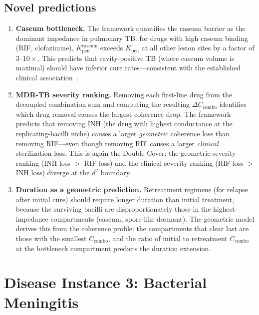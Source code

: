 \documentclass[11pt]{article}
\theoremstyle{plain}
\theoremstyle{definition}
\newcommand{\Ccombo}{C_{\mathrm{combo}}}
\begin{document}
\subsection{Novel predictions}
\label{sec:tb-predictions}

\begin{enumerate}
  \item \textbf{Caseum bottleneck.}
    The framework quantifies the caseum barrier as the dominant
    impedance in pulmonary TB: for drugs with high caseum binding
    (RIF, clofazimine), $K_{\mathrm{pen}}^{\mathrm{caseum}}$
    exceeds $K_{\mathrm{pen}}$ at all other lesion sites by a
    factor of $3$--$10\times$. This predicts that cavity-positive
    TB (where caseum volume is maximal) should have inferior cure
    rates---consistent with the established clinical
    association~\cite{Dartois2014}.

  \item \textbf{MDR-TB severity ranking.}
    Removing each first-line drug from the decoupled combination
    sum and computing the resulting $\Delta \Ccombo$ identifies
    which drug removal causes the largest coherence drop. The
    framework predicts that removing INH (the drug with highest
    conductance at the replicating-bacilli niche) causes a larger
    \emph{geometric} coherence loss than removing RIF---even though
    removing RIF causes a larger \emph{clinical} sterilization
    loss. This is again the Double Cover: the geometric severity
    ranking (INH loss $>$ RIF loss) and the clinical severity
    ranking (RIF loss $>$ INH loss) diverge at the $d^2$ boundary.

  \item \textbf{Duration as a geometric prediction.}
    Retreatment regimens (for relapse after initial cure) should
    require longer duration than initial treatment, because the
    surviving bacilli are disproportionately those in the
    highest-impedance compartments (caseum, spore-like dormant).
    The geometric model derives this from the coherence profile:
    the compartments that clear last are those with the smallest
    $\Ccombo$, and the ratio of initial to retreatment $\Ccombo$
    at the bottleneck compartment predicts the duration extension.
\end{enumerate}

\section{Disease Instance 3: Bacterial Meningitis}
\label{sec:meningitis}
\end{document}
